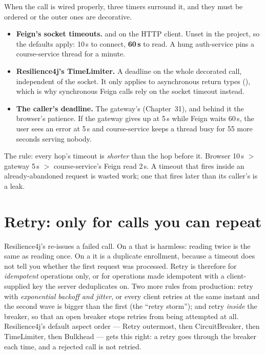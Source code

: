 When the call is wired properly, three timers surround it, and they
must be ordered or the outer ones are decorative.

\begin{itemize}
  \item \textbf{Feign's socket timeouts.}  and
   on the HTTP client. Unset in the project, so the
  defaults apply: 10\,s to connect, \textbf{60\,s} to read. A hung
  auth-service pins a course-service thread for a minute.
  \item \textbf{Resilience4j's TimeLimiter.} A deadline on the whole
  decorated call, independent of the socket. It only applies to
  asynchronous return types (), which is why
  synchronous Feign calls rely on the socket timeout instead.
  \item \textbf{The caller's deadline.} The gateway's
   (Chapter~31), and behind it the browser's
  patience. If the gateway gives up at 5\,s while Feign waits 60\,s, the
  user sees an error at 5\,s and course-service keeps a thread busy for
  55 more seconds serving nobody.
\end{itemize}

The rule: every hop's timeout is \emph{shorter} than the hop before it.
Browser 10\,s $>$ gateway 5\,s $>$ course-service's Feign read 2\,s. A
timeout that fires inside an already-abandoned request is wasted work;
one that fires later than its caller's is a leak.

\section{Retry: only for calls you can repeat}

Resilience4j's  re-issues a failed call. On a  that is harmless: reading twice is the same as reading
once. On a  it is a duplicate enrollment,
because a timeout does not tell you whether the first request was
processed. Retry is therefore for \emph{idempotent} operations only,
or for operations made idempotent with a client-supplied key the server
deduplicates on. Two more rules from production: retry with
\emph{exponential backoff and jitter}, or every client retries at the
same instant and the second wave is bigger than the first (the ``retry
storm''); and retry \emph{inside} the breaker, so that an open breaker
stops retries from being attempted at all. Resilience4j's default aspect
order --- Retry outermost, then CircuitBreaker, then TimeLimiter, then
Bulkhead --- gets this right: a retry goes through the breaker each
time, and a rejected call is not retried.

